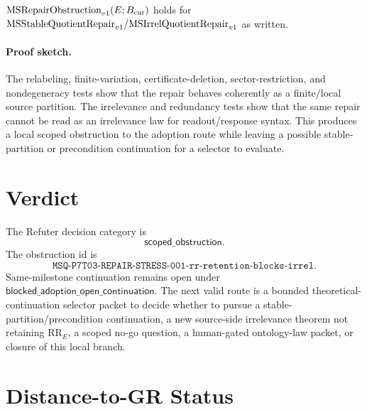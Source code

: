 \begin{proposition}
\(\mathrm{MSRepairObstruction}_{v1}(E;B_{\mathrm{cur}})\) holds for
\(\mathrm{MSStableQuotientRepair}_{v1}/\mathrm{MSIrrelQuotientRepair}_{v1}\) as written.
\end{proposition}

\paragraph{Proof sketch.}
The relabeling, finite-variation, certificate-deletion, sector-restriction,
and nondegeneracy tests show that the repair behaves coherently as a
finite/local source partition. The irrelevance and redundancy tests show that
the same repair cannot be read as an irrelevance law for readout/response
syntax. This produces a local scoped obstruction to the adoption route while
leaving a possible stable-partition or precondition continuation for a
selector to evaluate.

\section{Verdict}

The Refuter decision category is
\[
  \mathsf{scoped\_obstruction}.
\]
The obstruction id is
\[
  \texttt{MSQ-P7T03-REPAIR-STRESS-001-rr-retention-blocks-irrel}.
\]
Same-milestone continuation remains open under
\(\mathsf{blocked\_adoption\_open\_continuation}\). The next valid route is a
bounded theoretical-continuation selector packet to decide whether to pursue a
stable-partition/precondition continuation, a new source-side irrelevance
theorem not retaining \(\mathrm{RR}_E\), a scoped no-go question, a
human-gated ontology-law packet, or closure of this local branch.

\section{Distance-to-GR Status}

